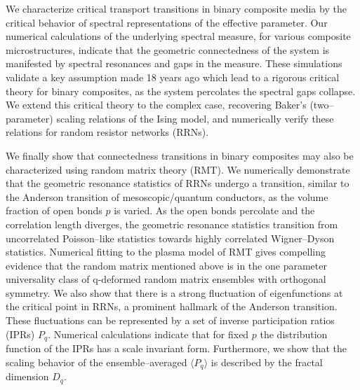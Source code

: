 \documentclass[english,12pt]{ttuthes}
\begin{document}
We characterize critical transport transitions in binary composite
media by the critical behavior of spectral representations of the 
effective parameter. Our numerical calculations of the underlying
spectral measure, for various composite microstructures, indicate that
the geometric connectedness of the system is manifested by spectral
resonances and gaps in the measure. These simulations validate a key
assumption made 18 years ago which lead to a rigorous critical theory
for binary composites, as the system percolates the spectral gaps
collapse. We extend this critical theory to the complex case,
recovering Baker's (two--parameter) scaling relations of the Ising
model, and numerically verify these relations for random resistor
networks (RRNs).   

We finally show that connectedness transitions in binary composites
may also be characterized using random matrix theory (RMT). We
numerically demonstrate that the geometric resonance statistics of
RRNs undergo a transition, similar to the Anderson transition of
mesoscopic/quantum conductors, as the volume fraction of open bonds
$p$ is varied. As the open bonds percolate and the correlation length
diverges, the geometric resonance statistics transition from
uncorrelated Poisson--like statistics towards highly correlated
Wigner--Dyson statistics. Numerical fitting to the plasma model of
RMT gives compelling evidence that the random matrix mentioned above is
in the one parameter universality class of q-deformed random matrix
ensembles with orthogonal symmetry. We also show that there is a
strong fluctuation of eigenfunctions at the critical point in RRNs, a
prominent hallmark of the Anderson transition. These fluctuations can
be represented by a set of inverse participation ratios (IPRs)
$P_q$. Numerical calculations indicate that for fixed $p$ the
distribution function of the IPRs has a scale invariant
form. Furthermore, we show that the scaling behavior of the
ensemble--averaged $\langle P_q\rangle$ is described by the fractal dimension
$D_q$.  

\renewcommand{\baselinestretch}{1}\selectfont
\listoffigures {}
\renewcommand{\baselinestretch}{1.5}\selectfont

\mainmatter \setcounter{page}{1} 
%

% 
\end{document}
